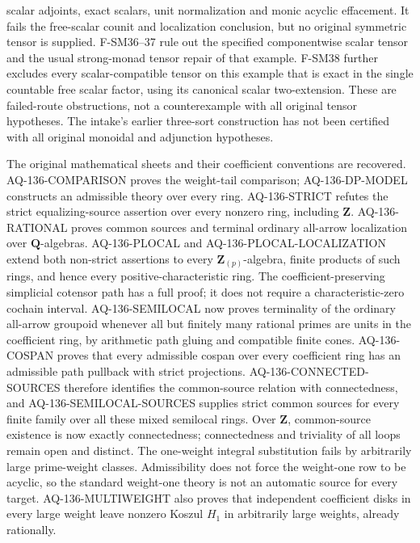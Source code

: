 \begin{description}[style=nextline,leftmargin=0pt]
scalar adjoints, exact scalars, unit normalization and monic acyclic
effacement. It fails the free-scalar counit and localization conclusion,
but no original symmetric tensor is supplied.
F-SM36--37 rule out the specified componentwise scalar tensor and
the usual strong-monad tensor repair of that example. F-SM38 further
excludes every scalar-compatible tensor on this example that is exact
in the single countable free scalar factor, using its canonical scalar
two-extension. These are
failed-route obstructions, not a counterexample with all original
tensor hypotheses.
The intake's earlier
three-sort construction has not been certified with all original
monoidal and adjunction hypotheses.
\item[Cote 136, physical 111--121: the integral non-strict questions.]
The original mathematical sheets and their coefficient conventions
are recovered. AQ-136-COMPARISON proves the weight-tail comparison;
AQ-136-DP-MODEL constructs an admissible theory over every ring.
AQ-136-STRICT refutes the strict equalizing-source assertion over
every nonzero ring, including $\mathbf Z$.
AQ-136-RATIONAL proves common sources and terminal ordinary
all-arrow localization over $\mathbf Q$-algebras.
AQ-136-PLOCAL and AQ-136-PLOCAL-LOCALIZATION extend both non-strict
assertions to every $\mathbf Z_{(p)}$-algebra, finite products of such
rings, and hence every positive-characteristic ring.
The coefficient-preserving simplicial cotensor path has a full proof;
it does not require a characteristic-zero cochain interval.
AQ-136-SEMILOCAL now proves terminality of the ordinary all-arrow
groupoid whenever all but finitely many rational primes are units in
the coefficient ring, by arithmetic path gluing and compatible finite
cones. AQ-136-COSPAN proves that every admissible cospan over every
coefficient ring has an admissible path pullback with strict projections.
AQ-136-CONNECTED-SOURCES therefore identifies the common-source relation
with connectedness, and AQ-136-SEMILOCAL-SOURCES supplies strict common
sources for every finite family over all these mixed semilocal rings.
Over $\mathbf Z$, common-source existence is now exactly connectedness;
connectedness and triviality of all loops remain open and distinct. The one-weight integral substitution fails by arbitrarily large
prime-weight classes. Admissibility does not force the weight-one
row to be acyclic, so the standard weight-one theory is not an
automatic source for every target. AQ-136-MULTIWEIGHT also proves
that independent coefficient disks in every large weight leave nonzero
Koszul $H_1$ in arbitrarily large weights, already rationally.

\end{description}
